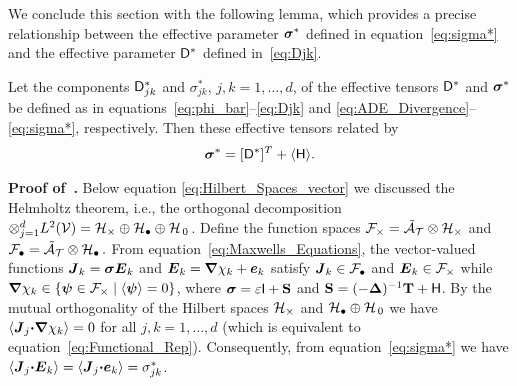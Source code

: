 \documentclass[amsa]{ipart}
\begin{document}
We conclude this section with the following lemma, which provides
a precise relationship between the effective parameter $\mbox{\boldmath${\sigma}$}^*$
defined in equation~\eqref{eq:sigma*} and the effective parameter
$\mathsf{D}^*$ defined in~\eqref{eq:Djk}. 
%
\begin{lemma}\label{lem:kappa_sigma}
%
Let the components $\mathsf{D}^*_{jk}$ and $\sigma^*_{jk}$, $j,k=1,\ldots,d$, of the
effective tensors $\mathsf{D}^*$ and $\mbox{\boldmath${\sigma}$}^*$ be defined as in
equations~\eqref{eq:phi_bar}--\eqref{eq:Djk} and
\eqref{eq:ADE_Divergence}--\eqref{eq:sigma*}, respectively. Then  
these effective tensors related by 
% 
\begin{align}\label{eq:Eff_Equiv}
  \bsig^*=[\Dm^*]^T+\langle\Hm\rangle.
\end{align}
%
\end{lemma}
%
%
\textbf{Proof of~.}\hspace{1ex}
%
Below equation \eqref{eq:Hilbert_Spaces_vector} we discussed the
Helmholtz theorem, i.e., the orthogonal decomposition
$\otimes_{j=1}^dL^2(\mathcal{V})=\mathcal{H}_\times\oplus\mathcal{H}_\bullet\oplus\mathcal{H}_{\,0}\,$. Define the function spaces 
$\mathcal{F}_\times=\tilde{\mathcal{A}}_{\mathcal{T}}\otimes\mathcal{H}_\times$ and $\mathcal{F}_\bullet=\tilde{\mathcal{A}}_{\mathcal{T}}\otimes\mathcal{H}_\bullet\,.$
From equation~\eqref{eq:Maxwells_Equations}, the vector-valued
functions $\boldsymbol{J}_k=\mbox{\boldmath${\sigma}$}\boldsymbol{E}_k$ and $\boldsymbol{E}_k=\mbox{\boldmath${\nabla}$} \chi_k+\boldsymbol{e}_k$ satisfy
$\boldsymbol{J}_k\in\mathcal{F}_\bullet$ and $\boldsymbol{E}_k\in\mathcal{F}_\times$ while
$\mbox{\boldmath${\nabla}$}\chi_k\in\{\mbox{\boldmath${\psi}$}\in\mathcal{F}_\times\;|\;\langle\mbox{\boldmath${\psi}$}\rangle=0\}$, where $\mbox{\boldmath${\sigma}$}=\varepsilon\mathsf{I}+\mathbf{S}$ and 
$\mathbf{S}=(-\mbox{\boldmath${\Delta}$})^{-1}\mathbf{T}+\mathsf{H}$. By the mutual orthogonality of the 
Hilbert spaces $\mathcal{H}_\times$ and $\mathcal{H}_\bullet\oplus\mathcal{H}_{\,0}$ we have
$\langle\boldsymbol{J}_j\mbox{\boldmath${\cdot}$}\mbox{\boldmath${\nabla}$}\chi_k\rangle=0$ for all $j,k=1,\ldots,d$ (which is equivalent
to equation~\eqref{eq:Functional_Rep}). Consequently, from
equation~\eqref{eq:sigma*} we have
$\langle\boldsymbol{J}_j\mbox{\boldmath${\cdot}$}\boldsymbol{E}_k\rangle=\langle\boldsymbol{J}_j\mbox{\boldmath${\cdot}$}\boldsymbol{e}_k\rangle=\sigma^*_{jk}$.  
\end{document}
